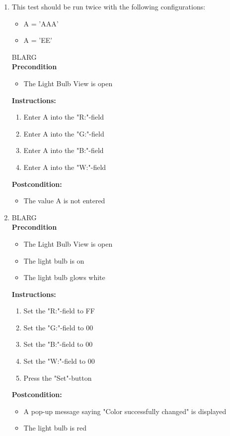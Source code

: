 \documentclass[a4paper]{article}
\newlength{\testlabellength}
\newenvironment{testlist}{\begin{enumerate}[label=\bfseries Instruction \thesubsection.\arabic* , labelindent=0pt, labelwidth=\testlabellength , leftmargin=2cm]}{\end{enumerate}}
\newenvironment{precondition}{
{\color{white}BLARG}\\ 
\textbf{Precondition}
\begin{itemize}[labelindent=0cm, labelwidth=2cm , leftmargin=1cm]
}
{\end{itemize}}
\newenvironment{instruction}{
\textbf{Instructions:}
\begin{enumerate}[label=\bfseries  \arabic*., labelindent=0cm, labelwidth=2cm , leftmargin=1cm]
}
{\end{enumerate}}
\newenvironment{postcondition}{
\textbf{Postcondition:}
\begin{itemize}[labelindent=0cm, labelwidth=2cm , leftmargin=1cm]
}
{\end{itemize}}
\begin{document}
\begin{appendices}
\begin{testlist}
	\item This test should be run twice with the following configurations:
		\begin{itemize}
			\item A = 'AAA'
			\item A = 'EE'
		\end{itemize}
		\begin{precondition}
			\item The Light Bulb View is open
		\end{precondition}
		\begin{instruction}
			\item Enter A into the "R:"-field
			\item Enter A into the "G:"-field
			\item Enter A into the "B:"-field
			\item Enter A into the "W:"-field
		\end{instruction}
		\begin{postcondition}
			\item The value A is not entered
		\end{postcondition}

	\item
		\begin{precondition}
			\item The Light Bulb View is open
			\item The light bulb is on
			\item The light bulb glows white
		\end{precondition}
		\begin{instruction}
			\item Set the "R:"-field to FF
			\item Set the "G:"-field to 00
			\item Set the "B:"-field to 00
			\item Set the "W:"-field to 00
			\item Press the "Set"-button
		\end{instruction}
		\begin{postcondition}
			\item A pop-up message saying "Color successfully changed" is displayed
			\item The light bulb is red
		\end{postcondition}


\end{testlist}
\end{appendices}
\end{document}
